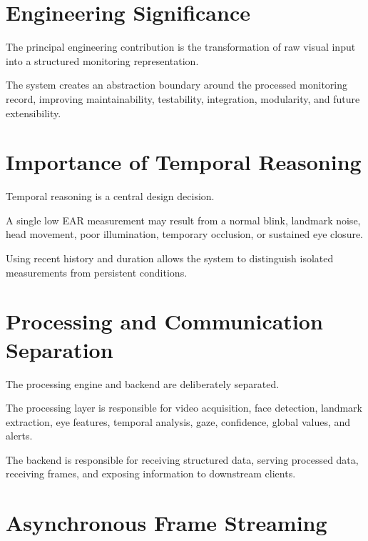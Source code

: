 \documentclass{tietreport}
\begin{document}
\section{Engineering Significance}

The principal engineering contribution is the transformation of raw
visual input into a structured monitoring representation.

The system creates an abstraction boundary around the processed
monitoring record, improving maintainability, testability, integration,
modularity, and future extensibility.


\section{Importance of Temporal Reasoning}

Temporal reasoning is a central design decision.

A single low EAR measurement may result from a normal blink, landmark
noise, head movement, poor illumination, temporary occlusion, or
sustained eye closure.

Using recent history and duration allows the system to distinguish
isolated measurements from persistent conditions.


\section{Processing and Communication Separation}

The processing engine and backend are deliberately separated.

The processing layer is responsible for video acquisition, face
detection, landmark extraction, eye features, temporal analysis, gaze,
confidence, global values, and alerts.

The backend is responsible for receiving structured data, serving
processed data, receiving frames, and exposing information to
downstream clients.


\section{Asynchronous Frame Streaming}
\end{document}
